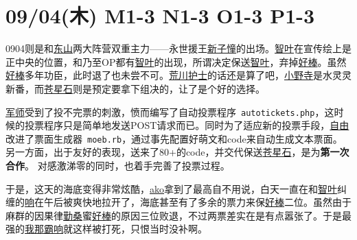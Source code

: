 \section{09/04(木) M1-3 N1-3 O1-3 P1-3}


0904则是和\uline{东山}两大阵营双重主力——永世援王\uline{新子憧}的出场。\uline{智叶}在宣传绘上是正中央的位置，和乃至OP都有\uline{智叶}的出现，所谓决定保送\uline{智叶}，弃掉\uline{好棒}。虽然\uline{好棒}多年功臣，此时退了也未尝不可。\uline{荒川护士}的话还是算了吧，\uline{小野寺}是水灵灵新番，而\uline{苍星石}则是预定要拿下组决的，让了是个好的选择。

\uline{军师}受到了投不完票的刺激，愤而编写了自动投票程序~\verb`autotickets.php`，这时候的投票程序只是简单地发送POST请求而已。同时为了适应新的投票手段，\uline{自由}改进了票面生成器~\verb`moeb.rb`，通过事先配置好萌文和code来自动生成文本票面。另一方面，出于友好的表现，送来了80+的code，并交代保送\uline{苍星石}，是为\textbf{第一次合作}。
对感激涕零的同时，也着手完善了投票过程。

于是，这天的海底变得非常炫酷，\uline{ako}拿到了最高自不用说，白天一直在和\uline{智叶}纠缠的\uline{响}在午后被爽快地拉开了，海底甚至有了多余的票力来保\uline{好棒}二位。虽然由于麻群的因果律\uline{勤桑}蜜\uline{好棒}的原因三位败退，不过两票差实在是有点嚣张了。于是最强的\uline{我那霸响}就这样被打死，只恨当时没补啊。


